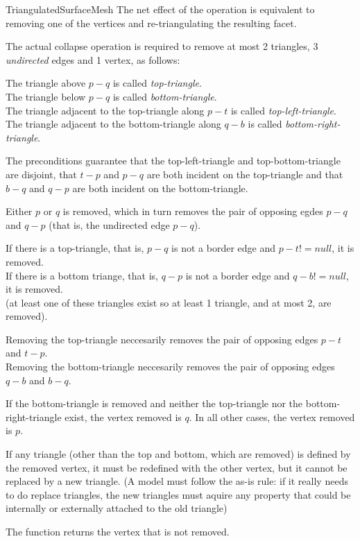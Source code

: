 \begin{ccRefConcept}{TriangulatedSurfaceMesh}
The net effect of the operation is equivalent to removing one of the vertices
and re-triangulating the resulting facet.

The actual collapse operation is required to remove at most 
2 triangles, 3 {\em undirected} edges and 1 vertex, as follows:

The triangle above $p-q$ is called {\em top-triangle}.\\
The triangle below $p-q$ is called {\em bottom-triangle}.\\
The triangle adjacent to the top-triangle along $p-t$ is called {\em top-left-triangle}.\\
The triangle adjacent to the bottom-triangle along $q-b$ is called {\em bottom-right-triangle}.

The preconditions guarantee that the top-left-triangle and top-bottom-triangle
are disjoint, that $t-p$ and $p-q$ are both incident on the top-triangle and that
$b-q$ and $q-p$ are both incident on the bottom-triangle.
      
Either $p$ or $q$ is removed, which in turn removes the pair of opposing egdes 
$p-q$ and $q-p$ (that is, the undirected edge $p-q$).

If there is a top-triangle, that is, $p-q$ is not a border edge and $p-t!=null$, it is removed.\\
If there is a bottom triange, that is, $q-p$ is not a border edge and $q-b!=null$, it is removed.\\
(at least one of these triangles exist so at least 1 triangle, and at most 2, are removed).
  
Removing the top-triangle neccesarily removes the pair of opposing edges $p-t$ and $t-p$.\\
Removing the bottom-triangle neccesarily removes the pair of opposing edges $q-b$ and $b-q$.
      
If the bottom-triangle is removed and neither the top-triangle nor
the bottom-right-triangle exist, the vertex removed is $q$. In all other
cases, the vertex removed is $p$.

If any triangle (other than the top and bottom, which are removed) is defined by
the removed vertex, it must be redefined with the other vertex, but it cannot
be replaced by a new triangle. (A model must follow the as-is rule: if it really
needs to do replace triangles, the new triangles must aquire any property 
that could be internally or externally attached to the old triangle)

The function returns the vertex that is not removed.

\ccHasModels
{}

\end{ccRefConcept}

